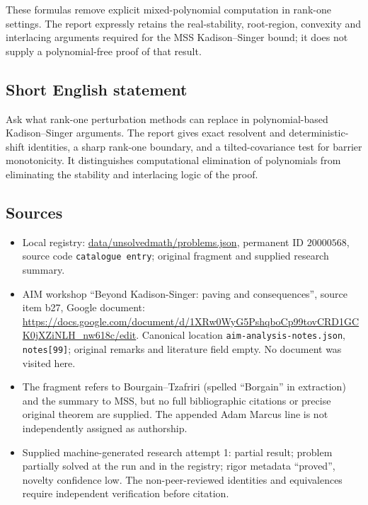 \documentclass[11pt]{article}
\begin{document}
These formulas remove explicit mixed-polynomial computation in rank-one settings. The report expressly retains the real-stability, root-region, convexity and interlacing arguments required for the MSS Kadison--Singer bound; it does not supply a polynomial-free proof of that result.
\subsection{Short English statement}
Ask what rank-one perturbation methods can replace in polynomial-based Kadison--Singer arguments. The report gives exact resolvent and deterministic-shift identities, a sharp rank-one boundary, and a tilted-covariance test for barrier monotonicity. It distinguishes computational elimination of polynomials from eliminating the stability and interlacing logic of the proof.
\subsection{Sources}
\begin{itemize}
\item Local registry: \url{data/unsolvedmath/problems.json}, permanent ID $20000568$, source code \texttt{catalogue entry}; original fragment and supplied research summary.
\item AIM workshop ``Beyond Kadison-Singer: paving and consequences'', source item b27, Google document: \url{https://docs.google.com/document/d/1XRw0WyG5PshqboCp99tovCRD1GCK0jXZiNLH_nw618c/edit}. Canonical location \texttt{aim-analysis-notes.json}, \texttt{notes[99]}; original remarks and literature field empty. No document was visited here.
\item The fragment refers to Bourgain--Tzafriri (spelled ``Borgain'' in extraction) and the summary to MSS, but no full bibliographic citations or precise original theorem are supplied. The appended Adam Marcus line is not independently assigned as authorship.
\item Supplied machine-generated research attempt 1: partial result; problem partially solved at the run and in the registry; rigor metadata ``proved'', novelty confidence low. The non-peer-reviewed identities and equivalences require independent verification before citation.
\end{itemize}
\end{document}
